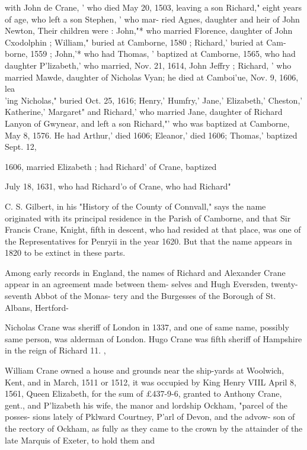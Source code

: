 \documentclass[oneside]{book}
\begin{document}
with John de Crane, ' who died May 20, 1503, leaving a son 
Richard," eight years of age, who left a son Stephen, ' who mar- 
ried Agnes, daughter and heir of John Newton, Their children 
were : John,"* who married Florence, daughter of John Cxodolphin ; 
William," buried at Camborne, 1580 ; Richard,' buried at Cam- 
borne, 1559 ; John,'* who had Thomas, ' baptized at Camborne, 
1565, who had daughter P'lizabeth,' who married, Nov. 21, 1614, 
John Jeffry ; Richard, ' who married Mawde, daughter of Nicholas 
Vyan; he died at Camboi'ue, Nov. 9, 1606, lea\\'ing Nicholas," 
buried Oct. 25, 1616; Henry,' Humfry,' Jane,' Elizabeth,' 
Cheston,' Katherine,' Margaret" and Richard,' who married Jane, 
daughter of Richard Lanyon of Gwynear, and left a son Richard,"' 
who was baptized at Camborne, May 8, 1576. He had Arthur,' 
died 1606; Eleanor,' died 1606; Thomas,' baptized Sept. 12, 

1606, married Elizabeth ; had Richard' of Crane, baptized 

July 18, 1631, who had Richard'o of Crane, who had Richard" 

C. S. Gilbert, in his "History of the County of Connvall," 
says the name originated with its principal residence in the Parish 
of Camborne, and that Sir Francis Crane, Knight, fifth in descent, 
who had resided at that place, was one of the Representatives for 
Penryii in the year 1620. But that the name appears in 1820 to 
be extinct in these parts. 

Among early records in England, the names of Richard and 
Alexander Crane appear in an agreement made between them- 
selves and Hugh Eversden, twenty-seventh Abbot of the Monas- 
tery and the Burgesses of the Borough of St. Albans, Hertford- 

Nicholas Crane was sheriff of London in 1337, and one of same 
name, possibly same person, was alderman of London. Hugo 
Crane was fifth sheriff of Hampshire in the reign of Richard 11. , 

William Crane owned a house and grounds near the ship-yards 
at Woolwich, Kent, and in March, 1511 or 1512, it was occupied 
by King Henry VIIL April 8, 1561, Queen Elizabeth, for the sum 
of £437-9-6, granted to Anthony Crane, gent., and P'lizabeth 
his wife, the manor and lordship Ockham, "parcel of the posses- 
sions lately of Pklward Courtney, P'arl of Devon, and the advow- 
son of the rectory of Ockham, as fully as they came to the crown 
by the attainder of the late Marquis of Exeter, to hold them and 
\end{document}
